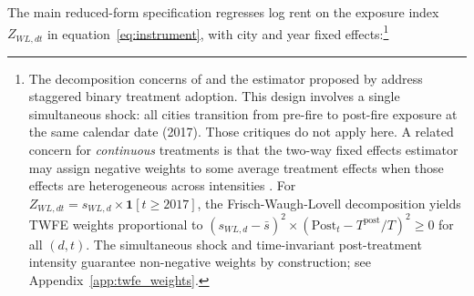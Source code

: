 \documentclass[12pt]{article}
\begin{document}
%
%
%
%
The main reduced-form specification regresses log rent on the exposure index $Z_{WL,dt}$ in equation~\eqref{eq:instrument}, with city and year fixed effects:\footnote{The decomposition concerns of \citet{goodman-bacon2021} and the estimator proposed by \citet{callaway2021} address staggered binary treatment adoption. This design involves a single simultaneous shock: all cities transition from pre-fire to post-fire exposure at the same calendar date (2017). Those critiques do not apply here. A related concern for \emph{continuous} treatments is that the two-way fixed effects estimator may assign negative weights to some average treatment effects when those effects are heterogeneous across intensities \citep{dechaisemartin2020}. For $Z_{WL,dt}=s_{WL,d}\times\mathbf{1}[t\geq 2017]$, the Frisch-Waugh-Lovell decomposition yields TWFE weights proportional to $(s_{WL,d}-\bar{s})^{2}\times(\mathrm{Post}_{t}-T^{\mathrm{post}}/T)^{2}\geq 0$ for all $(d,t)$. The simultaneous shock and time-invariant post-treatment intensity guarantee non-negative weights by construction; see Appendix~\ref{app:twfe_weights}.}
\end{document}
